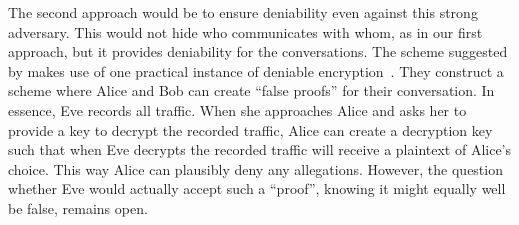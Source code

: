 The second approach would be to ensure deniability even against this strong 
adversary.
This would not hide who communicates with whom, as in our first approach, but 
it provides deniability for the conversations.
The scheme suggested by \textcite{OTPKX} makes use of one practical instance of 
deniable encryption~\cite{DeniableEncryption}.
They construct a scheme where Alice and Bob can create \enquote{false proofs} 
for their conversation.
In essence, Eve records all traffic.
When she approaches Alice and asks her to provide a key to decrypt the recorded 
traffic, Alice can create a decryption key such that when Eve decrypts the 
recorded traffic will receive a plaintext of Alice's choice.
This way Alice can plausibly deny any allegations.
However, the question whether Eve would actually accept such a \enquote{proof}, 
knowing it might equally well be false, remains open.
